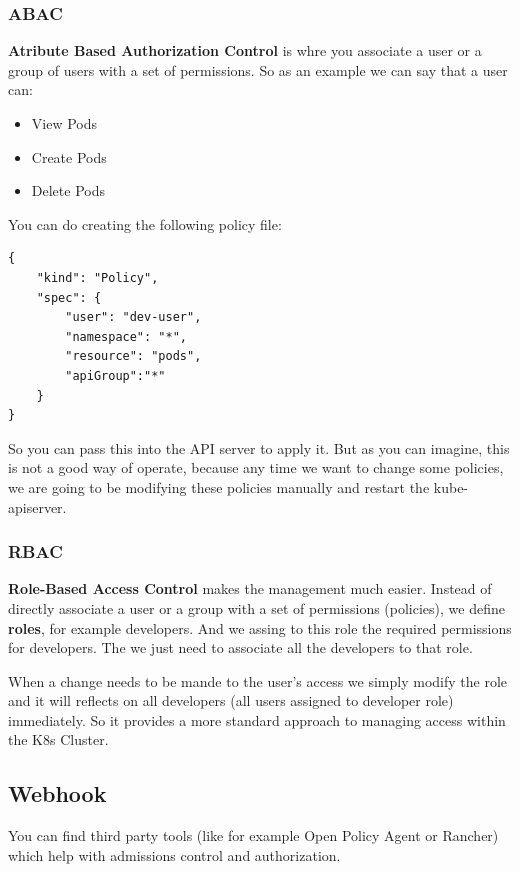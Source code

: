 \documentclass{article}
\newenvironment{codetemplate}[1][]{%
  \mybasecolorbox[#1]
  \itshape
}{%
  \endmybasecolorbox
}
\begin{document}
\subsubsection{ABAC}
\textbf{Atribute Based Authorization Control} is whre you associate a user or a group of users with a set of permissions.
So as an example we can say that a user can:
\begin{itemize}
    \item View Pods
    \item Create Pods
    \item Delete Pods
\end{itemize}

You can do creating the following policy file:
\begin{codetemplate}{}
\begin{verbatim}
{
    "kind": "Policy", 
    "spec": {
        "user": "dev-user", 
        "namespace": "*", 
        "resource": "pods", 
        "apiGroup":"*"
    }
}
\end{verbatim}
\end{codetemplate}

So you can pass this into the API server to apply it. But as you can imagine, this is not a good way of operate, because any time we want to
change some policies, we are going to be modifying these policies manually and restart the kube-apiserver.

\subsubsection{RBAC}
\textbf{Role-Based Access Control} makes the management much easier. Instead of directly associate a user or a group with a set of permissions (policies), we define \textbf{roles}, for example developers. And we assing to this role the required permissions for developers. The we just need to associate all the developers to that role.

When a change needs to be mande to the user's access we simply modify the role
and it will reflects on all developers (all users assigned to developer role) immediately. So it provides a more standard approach to managing access within the K8s Cluster.

\subsection{Webhook}
You can find third party tools (like for example Open Policy Agent or Rancher) which help with admissions control and authorization.
\end{document}
